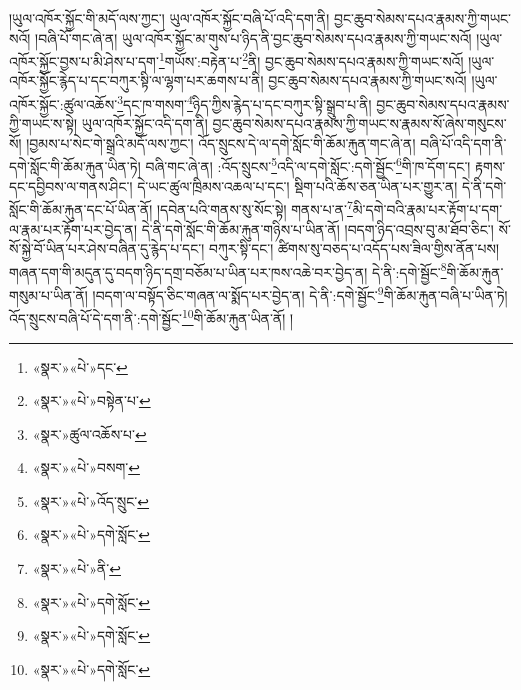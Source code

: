 །ཡུལ་འཁོར་སྐྱོང་གི་མདོ་ལས་ཀྱང་། ཡུལ་འཁོར་སྐྱོང་བཞི་པོ་འདི་དག་ནི། བྱང་ཆུབ་སེམས་དཔའ་རྣམས་ཀྱི་གཡང་སའོ། །བཞི་པོ་གང་ཞེ་ན། ཡུལ་འཁོར་སྐྱོང་མ་གུས་པ་ཉིད་ནི་བྱང་ཆུབ་སེམས་དཔའ་རྣམས་ཀྱི་གཡང་སའོ། །ཡུལ་འཁོར་སྐྱོང་བྱས་པ་མི་ཤེས་པ་དག་\footnote{«སྣར་»«པེ་»དང་}གཡོས་:བརྟེན་པ་\footnote{«སྣར་»«པེ་»བསྟེན་པ་}ནི། བྱང་ཆུབ་སེམས་དཔའ་རྣམས་ཀྱི་གཡང་སའོ། །ཡུལ་འཁོར་སྐྱོང་རྙེད་པ་དང་བཀུར་སྟི་ལ་ལྷག་པར་ཆགས་པ་ནི། བྱང་ཆུབ་སེམས་དཔའ་རྣམས་ཀྱི་གཡང་སའོ། །ཡུལ་འཁོར་སྐྱོང་:ཚུལ་འཆོས་\footnote{«སྣར་»ཚུལ་འཆོས་པ་}དང་ཁ་གསག་\footnote{«སྣར་»«པེ་»བསག་}ཉིད་ཀྱིས་རྙེད་པ་དང་བཀུར་སྟི་སྒྲུབ་པ་ནི། བྱང་ཆུབ་སེམས་དཔའ་རྣམས་ཀྱི་གཡང་ས་སྟེ། ཡུལ་འཁོར་སྐྱོང་འདི་དག་ནི། བྱང་ཆུབ་སེམས་དཔའ་རྣམས་ཀྱི་གཡང་ས་རྣམས་སོ་ཞེས་གསུངས་སོ། །བྱམས་པ་སེང་གེ་སྒྲའི་མདོ་ལས་ཀྱང་། འོད་སྲུངས་དེ་ལ་དགེ་སློང་གི་ཆོམ་རྐུན་གང་ཞེ་ན། བཞི་པོ་འདི་དག་ནི་དགེ་སློང་གི་ཆོམ་རྐུན་ཡིན་ཏེ། བཞི་གང་ཞེ་ན། :འོད་སྲུངས་\footnote{«སྣར་»«པེ་»འོད་སྲུང་}འདི་ལ་དགེ་སློང་:དགེ་སྦྱོང་\footnote{«སྣར་»«པེ་»དགེ་སློང་}གི་ཁ་དོག་དང་། རྟགས་དང་དབྱིབས་ལ་གནས་ཤིང་། དེ་ཡང་ཚུལ་ཁྲིམས་འཆལ་པ་དང་། སྡིག་པའི་ཆོས་ཅན་ཡིན་པར་གྱུར་ན། དེ་ནི་དགེ་སློང་གི་ཆོམ་རྐུན་དང་པོ་ཡིན་ནོ། །དབེན་པའི་གནས་སུ་སོང་སྟེ། གནས་པ་ན་\footnote{«སྣར་»«པེ་»ནི་}མི་དགེ་བའི་རྣམ་པར་རྟོག་པ་དག་ལ་རྣམ་པར་རྟོག་པར་བྱེད་ན། དེ་ནི་དགེ་སློང་གི་ཆོམ་རྐུན་གཉིས་པ་ཡིན་ནོ། །བདག་ཉིད་འབྲས་བུ་མ་ཐོབ་ཅིང་། སོ་སོ་སྐྱེ་བོ་ཡིན་པར་ཤེས་བཞིན་དུ་རྙེད་པ་དང་། བཀུར་སྟི་དང་། ཚིགས་སུ་བཅད་པ་འདོད་པས་ཟིལ་གྱིས་ནོན་པས། གཞན་དག་གི་མདུན་དུ་བདག་ཉིད་དགྲ་བཅོམ་པ་ཡིན་པར་ཁས་འཆེ་བར་བྱེད་ན། དེ་ནི་:དགེ་སྦྱོང་\footnote{«སྣར་»«པེ་»དགེ་སློང་}གི་ཆོམ་རྐུན་གསུམ་པ་ཡིན་ནོ། །བདག་ལ་བསྟོད་ཅིང་གཞན་ལ་སྨོད་པར་བྱེད་ན། དེ་ནི་:དགེ་སྦྱོང་\footnote{«སྣར་»«པེ་»དགེ་སློང་}གི་ཆོམ་རྐུན་བཞི་པ་ཡིན་ཏེ། འོད་སྲུངས་བཞི་པོ་དེ་དག་ནི་:དགེ་སྦྱོང་\footnote{«སྣར་»«པེ་»དགེ་སློང་}གི་ཆོམ་རྐུན་ཡིན་ནོ། །
